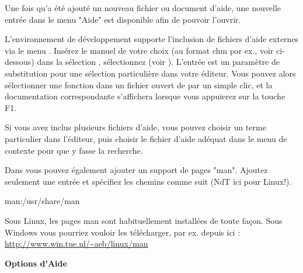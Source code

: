 Une fois qu'a été ajouté un nouveau fichier ou document d'aide, une nouvelle entrée dans le menu "Aide" est disponible afin de pouvoir l'ouvrir.

L'environnement de développement \codeblocks supporte l'inclusion de fichiers d'aide externes via le menu . Insérez le manuel de votre choix (au format chm par ex., voir ci-dessous) dans la sélection , sélectionnez  (voir ). L'entrée  est un paramètre de substitution pour une sélection particulière dans votre éditeur. Vous pouvez alors sélectionner une fonction dans un fichier ouvert de \codeblocks par un simple clic, et la documentation correspondante s'affichera lorsque vous appuierez sur la touche F1.

Si vous avez inclus plusieurs fichiers d'aide, vous pouvez choisir un terme particulier dans l'éditeur, puis choisir le fichier d'aide adéquat dans le menu de contexte  pour que \codeblocks y fasse la recherche.


Dans \codeblocks vous pouvez également ajouter un support de pages "man". Ajoutez seulement une entrée  et spécifiez les chemins comme suit (NdT ici pour Linux!).

\begin{cmd}
man:/usr/share/man
\end{cmd}

Sous Linux, les pages man sont habituellement installées de toute façon. Sous Windows vous pourriez vouloir les télécharger, par ex. depuis ici : \url{http://www.win.tue.nl/~aeb/linux/man}

\textbf{Options d'Aide}

